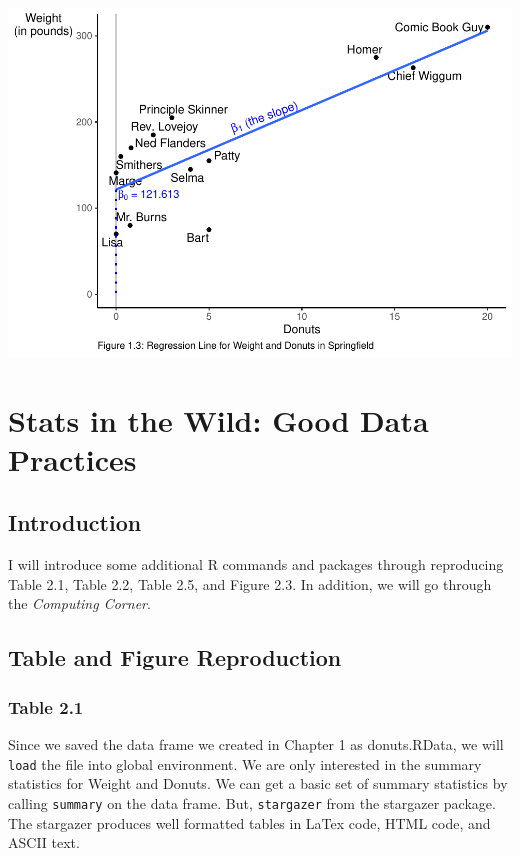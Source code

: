 \documentclass[]{book}
\begin{document}
\includegraphics{bailey_files/figure-latex/figure1.3-1.pdf}

\hypertarget{chp2}{%
\chapter{Stats in the Wild: Good Data Practices}\label{chp2}}

\hypertarget{introduction-1}{%
\section{Introduction}\label{introduction-1}}

I will introduce some additional R commands and packages through reproducing Table 2.1, Table 2.2, Table 2.5, and Figure 2.3. In addition, we will go through the \emph{Computing Corner}.

\hypertarget{table-and-figure-reproduction}{%
\section{Table and Figure Reproduction}\label{table-and-figure-reproduction}}

\hypertarget{table-2.1}{%
\subsection{Table 2.1}\label{table-2.1}}

Since we saved the data frame we created in Chapter 1 as donuts.RData, we will \texttt{load} the file into global environment. We are only interested in the summary statistics for Weight and Donuts. We can get a basic set of summary statistics by calling \texttt{summary} on the data frame. But, \texttt{stargazer} from
the stargazer package. The stargazer produces well formatted tables in LaTex code, HTML code, and ASCII text.
\end{document}

